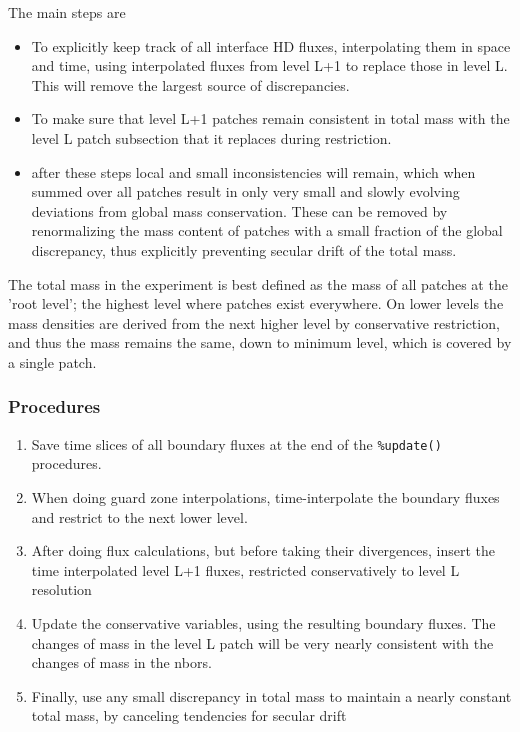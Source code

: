 \documentclass[paper=a4,fontsize=11pt]{scrartcl}
\numberwithin{equation}{section}		%
\numberwithin{figure}{section}			%
\numberwithin{table}{section}				%
\begin{document}
The main steps are
\begin{itemize}
    \item To explicitly keep track of all interface HD fluxes, interpolating them in space and time, using interpolated fluxes from level L+1 to replace those in level L.  This will remove the largest source of discrepancies.
    \item To make sure that level L+1 patches remain consistent in total mass with the level L patch subsection that it replaces during restriction.
    \item after these steps local and small inconsistencies will remain, which when summed over all patches result in only very small and slowly evolving deviations from global mass conservation.   These can be removed by  renormalizing the mass content of patches with a small fraction of the global discrepancy, thus explicitly preventing secular drift of the total mass.
\end{itemize}
The total mass in the experiment is best defined as the mass of all patches at the 'root level'; the highest level where patches exist everywhere.   On lower levels the mass densities are derived from the next higher level by conservative restriction, and thus the mass remains the same, down to minimum level, which is covered by a single patch.

\subsubsection{Procedures}
\begin{enumerate}
    \item Save time slices of all boundary fluxes at the end of the \verb|%update()| procedures.
    \item When doing guard zone interpolations, time-interpolate the boundary fluxes and restrict to the next lower level.
    \item After doing flux calculations, but before taking their divergences, insert the time interpolated level L+1 fluxes, restricted conservatively to level L resolution
    \item Update the conservative variables, using the resulting boundary fluxes.  The changes of mass in the level L patch will be very nearly consistent with the changes of mass in the nbors.
    \item Finally, use any small discrepancy in total mass to maintain a nearly constant total mass, by canceling tendencies for secular drift
\end{enumerate}
\end{document}
